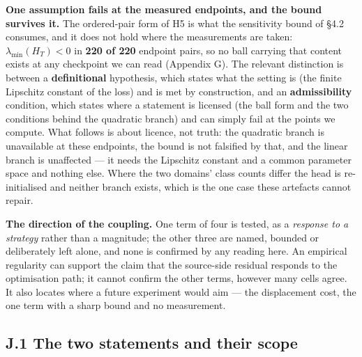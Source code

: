 \documentclass[pdflatex,sn-mathphys-ay]{sn-jnl}
\begin{document}
\textbf{One assumption fails at the measured endpoints, and the bound survives it.} The ordered-pair form of H5 is what the sensitivity bound of \S{}4.2 consumes, and it does not hold where the measurements are taken: $\lambda_{\min}(H_T)<0$ in \textbf{220 of 220} endpoint pairs, so no ball carrying that content exists at any checkpoint we can read (Appendix G). The relevant distinction is between a \textbf{definitional} hypothesis, which states what the setting is (the finite Lipschitz constant of the loss) and is met by construction, and an \textbf{admissibility} condition, which states where a statement is licensed (the ball form and the two conditions behind the quadratic branch) and can simply fail at the points we compute. What follows is about licence, not truth: the quadratic branch is unavailable at these endpoints, the bound is not falsified by that, and the linear branch is unaffected --- it needs the Lipschitz constant and a common parameter space and nothing else. Where the two domains' class counts differ the head is re-initialised and neither branch exists, which is the one case these artefacts cannot repair.

\textbf{The direction of the coupling.} One term of four is tested, as a \emph{response to a strategy} rather than a magnitude; the other three are named, bounded or deliberately left alone, and none is confirmed by any reading here. An empirical regularity can support the claim that the source-side residual responds to the optimisation path; it cannot confirm the other terms, however many cells agree. It also locates where a future experiment would aim --- the displacement cost, the one term with a sharp bound and no measurement.

\subsection*{J.1 The two statements and their scope}
\end{document}
